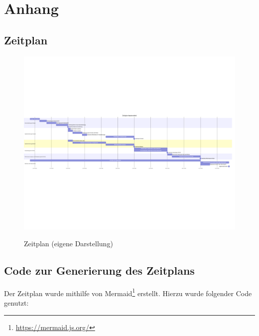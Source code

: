 \chapter{Anhang}



\section{Zeitplan}
\label{attachment:zeitplan}
\begin{figure}[H]
    \caption{Zeitplan (eigene Darstellung)}
    \includegraphics[width=1.0\linewidth, angle=90]{content/00_assets/meilensteine_gantt_diagram.png}
    \label{fig_zeitplan}
\end{figure}

\newpage

\section{Code zur Generierung des Zeitplans}
Der Zeitplan wurde mithilfe von Mermaid\footnote{\url{https://mermaid.js.org/}} erstellt. Hierzu wurde folgender Code genutzt:

